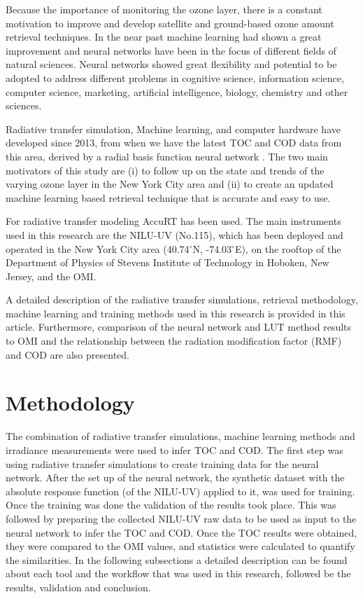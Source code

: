 \documentclass{optica-article}
\begin{document}
Because the importance of monitoring the ozone layer, there is a constant motivation to improve and develop satellite and ground-based ozone amount retrieval techniques. 
In the near past machine learning had shown a great improvement and neural networks have been in the focus of different fields of natural sciences. 
Neural networks showed great flexibility and potential to be adopted to address different problems in cognitive science, information science, computer science, marketing, artificial intelligence, biology, chemistry and other sciences.

Radiative transfer simulation, Machine learning, and computer hardware have developed since 2013, from when we have the latest TOC and COD data from this area, derived by a radial basis function neural network \cite{Fan:2014}.
The two main motivators of this study are 
(i) to follow up on the state and trends of the varying ozone layer in the New York City area and 
(ii) to create an updated machine learning based retrieval technique that is accurate and easy to use.

For radiative transfer modeling AccuRT has been used. 
The main instruments used in this research are the NILU-UV (No.115), which  has been deployed and operated in the New York City area (40.74$^\circ$N, -74.03$^\circ$E), on the rooftop of the Department of Physics of Stevens Institute of Technology in Hoboken, New Jersey, and the OMI.

A detailed description of the radiative transfer simulations, retrieval methodology, machine learning and training methods used in this research is provided in this article.
Furthermore, comparison of the neural network and LUT method results to OMI and the relationship between the radiation modification factor (RMF) and COD are also presented.


\section{Methodology}
\label{sec-method}

The combination of radiative transfer simulations, machine learning methods and irradiance measurements were used to infer TOC and COD. 
The first step was using radiative transfer simulations to create training data for the neural network. 
After the set up of the neural network, the synthetic dataset with the absolute response function (of the NILU-UV) applied to it, was used for training. 
Once the training was done the validation of the results took place. 
This was followed by preparing the collected NILU-UV raw data to be used as input to the neural network to infer the TOC and COD. Once the TOC results were obtained, they were compared to the OMI values, and statistics were calculated to quantify the similarities.
In the following subsections a detailed description can be found about each tool and the workflow that was used in this research, followed be the results, validation and conclusion.
\end{document}
